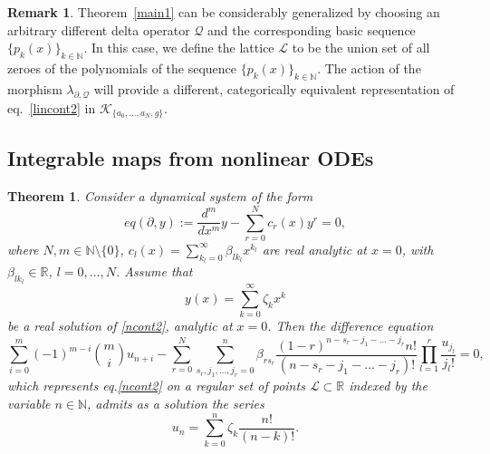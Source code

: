 \documentclass[10pt]{amsart}
\numberwithin{equation}{section}
\newtheorem{theorem}{Theorem}
\theoremstyle{definition}
\newtheorem{remark}{\textbf{Remark}}
\begin{document}
\begin{remark}
\label{rem10}
Theorem~\ref{main1} can be considerably generalized by choosing an arbitrary
different delta operator $\mathcal{Q}$ and the corresponding basic sequence
$\{p_{k}(x)\}_{k\in \mathbb{N}}$. In this case, we define the lattice
$\mathcal{L}$ to be the union set of all zeroes of the polynomials of the
sequence $\{p_{k}(x)\}_{k\in \mathbb{N}}$. The action of the morphism
$\lambda _{\partial ,\mathcal{Q}}$ will provide a different, categorically
equivalent representation of eq.~\eqref{lincont2} in
$\mathcal{K}_{\{ a_{0},\ldots , a_{N},g\}}$.
\end{remark}

\subsection{Integrable maps from nonlinear ODEs}
\label{sec5.2}

\begin{theorem}
\label{main2}
 Consider a dynamical system of the form
\begin{equation}
eq(\partial , y):=\frac{d^{m}}{dx^{m}}y-\sum _{r=0}^{N} c_{r}(x) y^{r}=0,
\label{ncont2}
\end{equation}
where $N, m\in \mathbb{N}\setminus \{0\}$,
$c_{l}(x)= \sum _{k_{l}=0}^{\infty}\beta _{l k_{l}} x^{k_{l}}$ are real analytic
at $x=0$, with $\beta _{l k_{l}}\in \mathbb{R}$, $l=0,\ldots ,N$. Assume
that
\begin{equation}
y(x)=\sum _{k=0}^{\infty} \zeta _{k} x^{k}
\label{eq5.20}
\end{equation}
be a real solution of \eqref{ncont2}, analytic at $x=0$. Then the difference
equation
\begin{equation}
\sum _{i=0}^{m}(-1)^{m-i}\binom{m}{i}u_{n+i}-\sum _{r=0}^{N} \sum _{s_{r},j_{1},
\ldots ,j_{r}=0}^{n}\beta _{rs_{r}}
\frac{(1-r)^{n-s_{r}-j_{1}-\ldots -j_{r} } n!}{ (n-s_{r}-j_{1}-\ldots -j_{r})! }
\prod _{l=1}^{r}\frac{u_{j_{l}}}{j_{l}!}=0,
\label{eqnonlin}
\end{equation}
which represents eq.\eqref{ncont2} on a regular set of points
$\mathcal{L}\subset \mathbb{R}$ indexed by the variable
$n\in \mathbb{N}$, admits as a solution the series
\begin{equation}
u_{n}=\sum _{k=0}^{n} \zeta _{k} \frac{n!}{(n-k)!}.
\label{part}
\end{equation}
\end{theorem}
\end{document}
